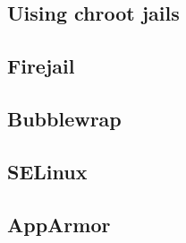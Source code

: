 
\subsection{Uising chroot jails}

\subsection{Firejail}

\subsection{Bubblewrap}

\subsection{SELinux}

\subsection{AppArmor}
